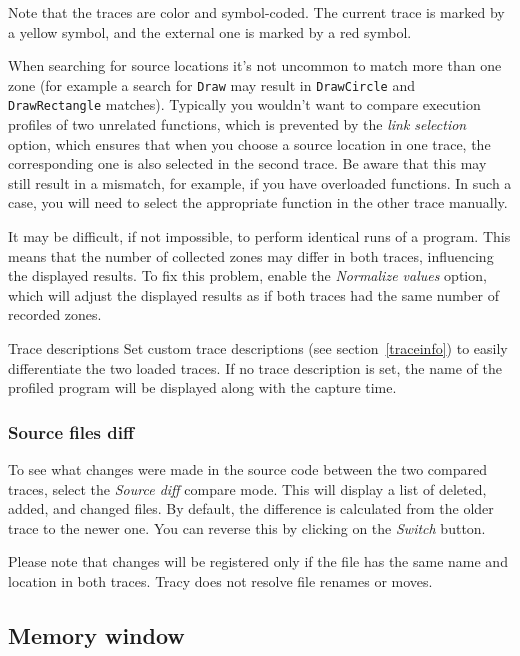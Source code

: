 \documentclass[hidelinks,titlepage,a4paper,twoside]{article}
\begin{document}
Note that the traces are color and symbol-coded. The current trace is marked by a yellow \faLemon{} symbol, and the external one is marked by a red \faGem{} symbol.

When searching for source locations it's not uncommon to match more than one zone (for example a search for \texttt{Draw} may result in \texttt{DrawCircle} and \texttt{DrawRectangle} matches). Typically you wouldn't want to compare execution profiles of two unrelated functions, which is prevented by the \emph{link selection} option, which ensures that when you choose a source location in one trace, the corresponding one is also selected in the second trace. Be aware that this may still result in a mismatch, for example, if you have overloaded functions. In such a case, you will need to select the appropriate function in the other trace manually.

It may be difficult, if not impossible, to perform identical runs of a program. This means that the number of collected zones may differ in both traces, influencing the displayed results. To fix this problem, enable the \emph{Normalize values} option, which will adjust the displayed results as if both traces had the same number of recorded zones.

\begin{bclogo}[
noborder=true,
couleur=black!5,
logo=\bclampe
]{Trace descriptions}
Set custom trace descriptions (see section~\ref{traceinfo}) to easily differentiate the two loaded traces. If no trace description is set, the name of the profiled program will be displayed along with the capture time.
\end{bclogo}

\subsubsection{Source files diff}

To see what changes were made in the source code between the two compared traces, select the \emph{Source diff} compare mode. This will display a list of deleted, added, and changed files. By default, the difference is calculated from the older trace to the newer one. You can reverse this by clicking on the \emph{Switch} button.

Please note that changes will be registered only if the file has the same name and location in both traces. Tracy does not resolve file renames or moves.

\subsection{Memory window}
\label{memorywindow}
\end{document}
